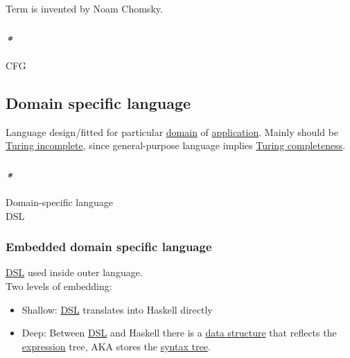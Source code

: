 \documentclass[11pt]{article}
\begin{document}
Term is invented by Noam Chomsky.\\

\subsubsection{\emph{*}}
\label{sec:orgabcafea}

\label{org45e5dce}CFG\\

\subsection{\label{orgd1aa547}Domain specific language}
\label{sec:orgd764487}
Language design/fitted for particular \hyperref[org494b48a]{domain} of \hyperref[org2b89e66]{application}. Mainly should be \hyperref[org9dc3717]{Turing incomplete}, since general-purpose language implies \hyperref[orgea33e28]{Turing completeness}.\\

\subsubsection{\emph{*}}
\label{sec:orgdf14bf3}

\label{org1d28d36}Domain-specific language\\
\label{orgd09f9ec}DSL\\

\subsubsection{\label{orgde620ae}Embedded domain specific language}
\label{sec:orgf80c2ab}

\hyperref[orgd09f9ec]{DSL} used inside outer language.\\

Two levels of embedding:\\

\begin{itemize}
\item Shallow: \hyperref[orgd09f9ec]{DSL} translates into Haskell directly\\
\item Deep: Between \hyperref[orgd09f9ec]{DSL} and Haskell there is a \hyperref[org51ce163]{data structure} that reflects the \hyperref[org9021dd7]{expression} tree, AKA stores the \hyperref[orgda43e7b]{syntax tree}.\\
\end{itemize}
\end{document}
